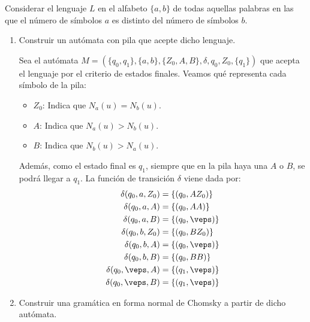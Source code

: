 \begin{ejercicio}\label{ej:1.5.7}
    Considerar el lenguaje $L$ en el alfabeto $\{a,b\}$ de todas aquellas palabras en las que el número de símbolos $a$ es distinto del número de símbolos $b$.
    \begin{enumerate}
        \item Construir un autómata con pila que acepte dicho lenguaje.
        
        Sea el autómata $M = (\{q_0,q_1\},\{a,b\},\{Z_0,A,B\},\delta,q_0,Z_0,\{q_1\})$ que acepta el lenguaje por el criterio de estados finales.
        Veamos qué representa cada símbolo de la pila:
        \begin{itemize}
            \item $Z_0$: Indica que $N_a(u)=N_b(u)$.
            \item $A$: Indica que $N_a(u)>N_b(u)$.
            \item $B$: Indica que $N_b(u)>N_a(u)$.
        \end{itemize}
        Además, como el estado final es $q_1$, siempre que en la pila haya una $A$ o $B$, se podrá llegar a $q_1$.
        La función de transición $\delta$ viene dada por:
        \begin{align*}
            \delta(q_0,a,Z_0) &= \{(q_0,AZ_0)\} \\
            \delta(q_0,a,A) &= \{(q_0,AA)\} \\
            \delta(q_0,a,B) &= \{(q_0,\veps)\} \\
            \delta(q_0,b,Z_0) &= \{(q_0,BZ_0)\} \\
            \delta(q_0,b,A) &= \{(q_0,\veps)\} \\
            \delta(q_0,b,B) &= \{(q_0,BB)\} \\
            \delta(q_0,\veps,A) &= \{(q_1,\veps)\} \\
            \delta(q_0,\veps,B) &= \{(q_1,\veps)\}
        \end{align*}
        
        
        \item Construir una gramática en forma normal de Chomsky a partir de dicho autómata.
        
    \end{enumerate}
\end{ejercicio}

